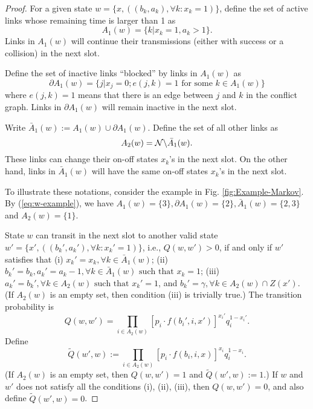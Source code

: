\documentclass{IEEEtran}
\begin{document}
\begin{proof}
For a given state $w=\{x,((b_{k},a_{k}),\forall k:x_{k}=1)\}$, define
the set of active links whose remaining time is larger than 1 as\[
A_{1}(w)=\{k|x_{k}=1,a_{k}>1\}.\]
Links in $A_{1}(w)$ will continue their transmissions (either with
success or a collision) in the next slot. 

Define the set of inactive links {}``blocked'' by links in $A_{1}(w)$
as\[
\partial A_{1}(w)=\{j|x_{j}=0;e(j,k)=1\text{ for some }k\in A_{1}(w)\}\]
where $e(j,k)=1$ means that there is an edge between $j$ and $k$
in the conflict graph. Links in $\partial A_{1}(w)$ will remain inactive
in the next slot. 

Write $\bar{A}_{1}(w):=A_{1}(w)\cup\partial A_{1}(w)$. Define the
set of all other links as\begin{equation}
A_{2}(w)={\cal N}\backslash\bar{A}_{1}(w).\label{eq:A_2}\end{equation}
These links can change their on-off states $x_{k}$'s in the next
slot. On the other hand, links in $\bar{A}_{1}(w)$ will have the
same on-off states $x_{k}$'s in the next slot.

To illustrate these notations, consider the example in Fig. \ref{fig:Example-Markov}.
By (\ref{eq:w-example}), we have $A_{1}(w)=\{3\},\partial A_{1}(w)=\{2\},\bar{A}_{1}(w)=\{2,3\}$
and $A_{2}(w)=\{1\}$.

State $w$ can transit in the next slot to another valid state $w'=\{x',((b_{k}',a_{k}'),\forall k:x_{k}'=1)\}$,
i.e., $Q(w,w')>0$, if and only if $w'$ satisfies that (i) $x_{k}'=x_{k},\forall k\in\bar{A}_{1}(w)$;
(ii) $b_{k}'=b_{k},a_{k}'=a_{k}-1,\forall k\in\bar{A}_{1}(w)\text{ such that }x_{k}=1$;
(iii) $a_{k}'=b_{k}',\forall k\in A_{2}(w)\text{ such that }x_{k}'=1$,
and $b_{k}'=\gamma,\forall k\in A_{2}(w)\cap Z(x')$. (If $A_{2}(w)$
is an empty set, then condition (iii) is trivially true.) The transition
probability is \begin{equation}
Q(w,w')=\prod_{i\in A_{2}(w)}[p_{i}\cdot f(b_{i}',i,x')]^{x_{i}'}q_{i}^{1-x_{i}'}.\label{eq:transition}\end{equation}
Define\begin{equation}
\tilde{Q}(w',w):=\prod_{i\in A_{2}(w)}[p_{i}\cdot f(b_{i},i,x)]^{x_{i}}q_{i}^{1-x_{i}}.\label{eq:transition-reversed}\end{equation}
(If $A_{2}(w)$ is an empty set, then $Q(w,w')=1$ and $\tilde{Q}(w',w):=1$.)
If $w$ and $w'$ does not satisfy all the conditions (i), (ii), (iii),
then $Q(w,w')=0$, and also define $\tilde{Q}(w',w)=0$. 


\end{proof}
\end{document}
